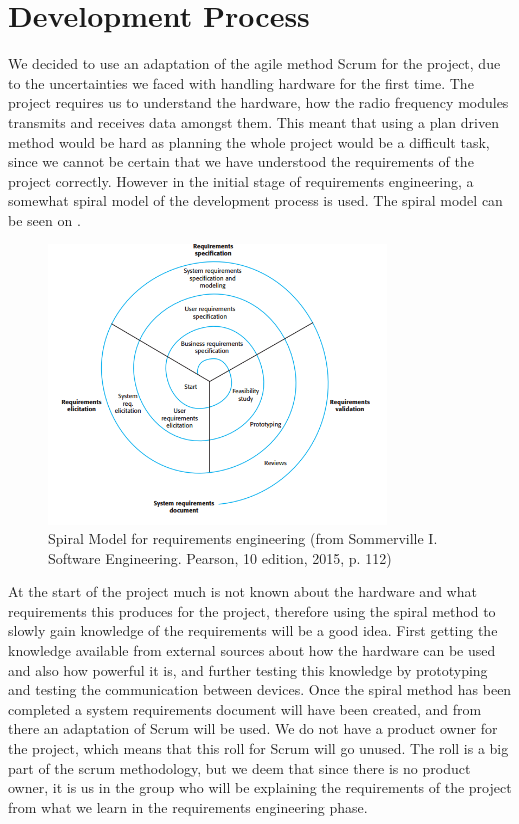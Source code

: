 
\chapter{Development Process}
We decided to use an adaptation of the agile method Scrum for the project, due to the uncertainties we faced with handling hardware for the first time. The project requires us to understand the hardware, how the radio frequency modules transmits and receives data amongst them. This meant that using a plan driven method would be hard as planning the whole project would be a difficult task, since we cannot be certain that we have understood the requirements of the project correctly.
However in the initial stage of requirements engineering, a somewhat spiral model of the development process is used. The spiral model can be seen on .

\begin{figure}[ht]
\centering
\includegraphics[width=0.80\textwidth]{Figures/spiral.png}
\caption{Spiral Model for requirements engineering (from Sommerville I. Software Engineering. Pearson, 10 edition, 2015, p. 112)}\label{fig:spiralDiagram}
\end{figure}

At the start of the project much is not known about the hardware and what requirements this produces for the project, therefore using the spiral method to slowly gain knowledge of the requirements will be a good idea. First getting the knowledge available from external sources about how the hardware can be used and also how powerful it is, and further testing this knowledge by prototyping and testing the communication between devices. 
Once the spiral method has been completed a system requirements document will have been created, and from there an adaptation of Scrum will be used.
We do not have a product owner for the project, which means that this roll for Scrum will go unused. The roll is a big part of the scrum methodology, but we deem that since there is no product owner, it is us in the group who will be explaining the requirements of the project from what we learn in the requirements engineering phase. 

